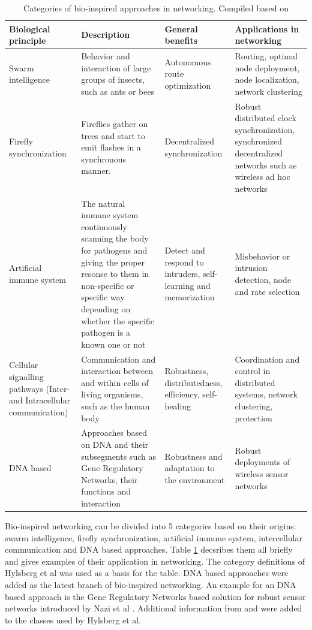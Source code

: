 \documentclass[cameraready]{IWORK2014}
\begin{document}
\begin{table}
    \centering
	\begin{tabularx}{0.90\textwidth}{|X|X|X|X|}
		\hline \textbf{Biological principle} & \textbf{Description} & \textbf{General benefits} & \textbf{Applications in networking} \\ \hline
		Swarm intelligence & Behavior and interaction of large groups of insects, such as ants or bees & Autonomous route optimization & Routing, optimal node deployment, node localization, network clustering \\ \hline
		Firefly synchronization & Fireflies gather on trees and start to emit flashes in a synchronous manner. & Decentralized synchronization & Robust distributed clock synchronization, synchronized decentralized networks such as wireless ad hoc networks \\ \hline
		Artificial immune system & The natural immune system continuously scanning the body for pathogens and giving the proper resonse to them in non-specific or specific way depending on whether the specific pathogen is a known one or not & Detect and respond to intruders, self-learning and memorization & Misbehavior or intrusion detection, node and rate selection \\ \hline
		Cellular signalling pathways (Inter- and Intracellular communication) & Communication and interaction between and within cells of living organisms, such as the human body & Robustness, distributedness, efficiency, self-healing & Coordination and control in distributed systems, network clustering, protection \\ \hline
		DNA based & Approaches based on DNA and their subsegments such as Gene Regulatory Networks, their functions and interaction & Robustness and adaptation to the environment & Robust deployments of wireless sensor networks \\ \hline
	\end{tabularx}
	\caption{Categories of bio-inspired approaches in networking. Compiled based on \cite{hylsberg2011bioinspired, tyrrell2006fireflies, nazi2014deployment, zhang2013swarm}}
	\label{tbl:bio-categories}
\end{table}

Bio-inspired networking can be divided into 5 categories based on their origins: swarm intelligence, firefly synchronization, artificial immune system, intercellular communication and DNA based approaches. Table \ref{tbl:bio-categories} decsribes them all briefly and gives examples of their application in networking. The category definitions of Hylsberg et al \cite{hylsberg2011bioinspired} was used as a basis for the table. DNA based approaches were added as the latest branch of bio-inspired networking. An example for an DNA based approach is the Gene Regulatory Networks based solution for robust sensor networks introduced by Nazi et al \cite{nazi2014deployment}. Additional information from \cite{tyrrell2006fireflies} and \cite{zhang2013swarm} were added to the classes used by Hylsberg et al.
\end{document}
